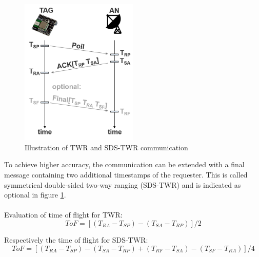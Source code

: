 \begin{figure}[th]
\centering
\includegraphics[width=0.5\textwidth]{Figures/two_way_ranging}
\decoRule
\caption[Two Way Ranging]{Illustration of TWR and SDS-TWR communication}
\label{fig:two_way_ranging}
\end{figure}

To achieve higher accuracy, the communication can be extended with a final message containing two additional timestamps of the requester. This is called symmetrical double-sided two-way ranging (SDS-TWR) \cite{Wikipedia} and is indicated as optional in figure \ref{fig:two_way_ranging}.\\
\\
Evaluation of time of flight for TWR:\\
\begin{equation}
 ToF = [(T_{RA}-T_{SP})-(T_{SA}-T_{RP})] / 2
\label{eqn:TWR}
\end{equation}

Respectively the time of flight for SDS-TWR:\\
\begin{equation}
ToF = [(T_{RA}-T_{SP})-(T_{SA}-T_{RP}) + (T_{RF}-T_{SA})-(T_{SF}-T_{RA}) ]/ 4
\label{eqn:SDS-TWR}
\end{equation}

